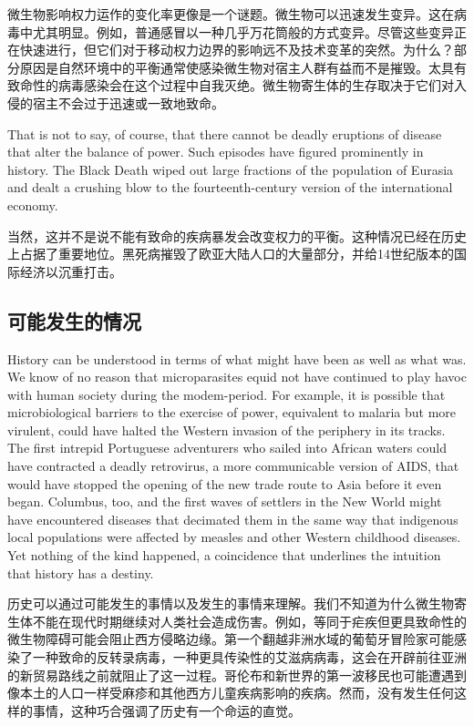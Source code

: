 \begin{Parallel}{97mm}{45mm}
  \ParallelRText
  {微生物影响权力运作的变化率更像是一个谜题。微生物可以迅速发生变异。这在病毒中尤其明显。例如，普通感冒以一种几乎万花筒般的方式变异。尽管这些变异正在快速进行，但它们对于移动权力边界的影响远不及技术变革的突然。为什么？部分原因是自然环境中的平衡通常使感染微生物对宿主人群有益而不是摧毁。太具有致命性的病毒感染会在这个过程中自我灭绝。微生物寄生体的生存取决于它们对入侵的宿主不会过于迅速或一致地致命。}
  \ParallelPar



  \ParallelLText
  {That is not to say, of course, that there cannot be deadly eruptions of disease that alter the balance of power. Such episodes have figured prominently in history. The Black Death wiped out large fractions of the population of Eurasia and dealt a crushing blow to the fourteenth-century version of the international economy.}
  
  \ParallelRText
  {当然，这并不是说不能有致命的疾病暴发会改变权力的平衡。这种情况已经在历史上占据了重要地位。黑死病摧毁了欧亚大陆人口的大量部分，并给14世纪版本的国际经济以沉重打击。}
  \ParallelPar

  \subsection{可能发生的情况}

  \ParallelLText
  {History can be understood in terms of what might have been as well as what was. We know of no reason that microparasites equid not have continued to play havoc with human society during the modem-period. For example, it is possible that microbiological barriers to the exercise of power, equivalent to malaria but more virulent, could have halted the Western invasion of the periphery in its tracks. The first intrepid Portuguese adventurers who sailed into African waters could have contracted a deadly retrovirus, a more communicable version of AIDS, that would have stopped the opening of the new trade route to Asia before it even began. Columbus, too, and the first waves of settlers in the New World might have encountered diseases that decimated them in the same way that indigenous local populations were affected by measles and other Western childhood diseases. Yet nothing of the kind happened, a coincidence that underlines the intuition that history has a destiny.}
  
  \ParallelRText
  {历史可以通过可能发生的事情以及发生的事情来理解。我们不知道为什么微生物寄生体不能在现代时期继续对人类社会造成伤害。例如，等同于疟疾但更具致命性的微生物障碍可能会阻止西方侵略边缘。第一个翻越非洲水域的葡萄牙冒险家可能感染了一种致命的反转录病毒，一种更具传染性的艾滋病病毒，这会在开辟前往亚洲的新贸易路线之前就阻止了这一过程。哥伦布和新世界的第一波移民也可能遭遇到像本土的人口一样受麻疹和其他西方儿童疾病影响的疾病。然而，没有发生任何这样的事情，这种巧合强调了历史有一个命运的直觉。}
  \ParallelPar



\end{Parallel}
